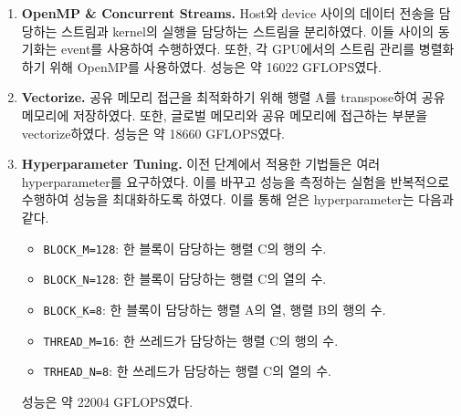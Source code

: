 \begin{itemize}
{\begin{enumerate}
            \item {
                \textbf{OpenMP \& Concurrent Streams.} Host와 device 사이의 데이터 전송을 담당하는 스트림과
                kernel의 실행을 담당하는 스트림을 분리하였다. 이들 사이의 동기화는 event를 사용하여 수행하였다.
                또한, 각 GPU에서의 스트림 관리를 병렬화하기 위해 OpenMP를 사용하였다. 성능은 약 16022 GFLOPS였다.
            }
            \item {
                \textbf{Vectorize.} 공유 메모리 접근을 최적화하기 위해 행렬 A를 transpose하여 공유 메모리에 저장하였다.
                또한, 글로벌 메모리와 공유 메모리에 접근하는 부분을 vectorize하였다. 성능은 약 18660 GFLOPS였다.
            }
            \item {
                \textbf{Hyperparameter Tuning.} 이전 단계에서 적용한 기법들은 여러 hyperparameter를 요구하였다.
                이를 바꾸고 성능을 측정하는 실험을 반복적으로 수행하여 성능을 최대화하도록 하였다. 이를 통해 얻은
                hyperparameter는 다음과 같다.
                \begin{itemize}
                    \item \texttt{BLOCK\_M=128}: 한 블록이 담당하는 행렬 C의 행의 수.
                    \item \texttt{BLOCK\_N=128}: 한 블록이 담당하는 행렬 C의 열의 수.
                    \item \texttt{BLOCK\_K=8}: 한 블록이 담당하는 행렬 A의 열, 행렬 B의 행의 수.
                    \item \texttt{THREAD\_M=16}: 한 쓰레드가 담당하는 행렬 C의 행의 수.
                    \item \texttt{TRHEAD\_N=8}: 한 쓰레드가 담당하는 행렬 C의 열의 수.
                \end{itemize}
                성능은 약 22004 GFLOPS였다.
            }
            
        \end{enumerate}
        
    }


\end{itemize}